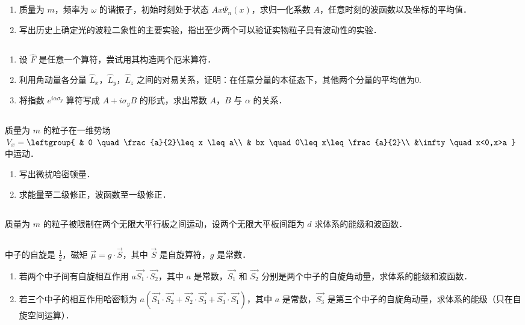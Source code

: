 
\subsection{ }
\begin{enumerate}
\item 质量为 $m$，频率为 $\omega$ 的谐振子，初始时刻处于状态 $Ax\varPsi_{n}(x)$，求归一化系数 $A$，任意时刻的波函数以及坐标的平均值．
\item 写出历史上确定光的波粒二象性的主要实验，指出至少两个可以验证实物粒子具有波动性的实验．
\end{enumerate}
\subsection{ }
\begin{enumerate}
\item 设 $\hat{F}$ 是任意一个算符，尝试用其构造两个厄米算符．
\item 利用角动量各分量 $\hat{L}_{x}$，$\hat{L}_{y}$，$\hat{L}_{z}$ 之间的对易关系，证明：在任意分量的本征态下，其他两个分量的平均值为0.
\item 将指数 $e^{i\alpha \sigma_{y}}$ 算符写成 $A+i\sigma_{y}B$ 的形式，求出常数 $A$，$B$ 与 $\alpha$ 的关系．
\end{enumerate}
\subsection{ }
质量为 $m$ 的粒子在一维势场 $V_{x}=\leftgroup{
    & 0 \quad \frac{a}{2}\leq x \leq a\\
    & bx \quad 0\leq x\leq\frac{a}{2}\\
    &\infty \quad x<0,x>a
    }$ 中运动．
\begin{enumerate}
\item 写出微扰哈密顿量．
\item 求能量至二级修正，波函数至一级修正．
\end{enumerate}
\subsection{ }
质量为 $m$ 的粒子被限制在两个无限大平行板之间运动，设两个无限大平板间距为 $d$ 求体系的能级和波函数．
\subsection{ }
中子的自旋是 $\frac{1}{2}$，磁矩 $\vec{\mu}=g\cdot\vec{S}$，其中 $\vec{S}$ 是自旋算符，$g$ 是常数．
\begin{enumerate}
\item 若两个中子间有自旋相互作用 $a\vec{S_1}\cdot\vec{S_2}$，其中 $a$ 是常数，$\vec{S_1}$ 和 $\vec{S_2}$ 分别是两个中子的自旋角动量，求体系的能级和波函数．
\item 若三个中子的相互作用哈密顿为 $a(\vec{S_{1}}\cdot\vec{S_{2}}+\vec{S_{2}}\cdot\vec{S_{3}}+\vec{S_{3}}\cdot\vec{S_{1}})$，其中 $a$ 是常数，$\vec{S_{3}}$ 是第三个中子的自旋角动量，求体系的能级（只在自旋空间运算）．
\end{enumerate}
